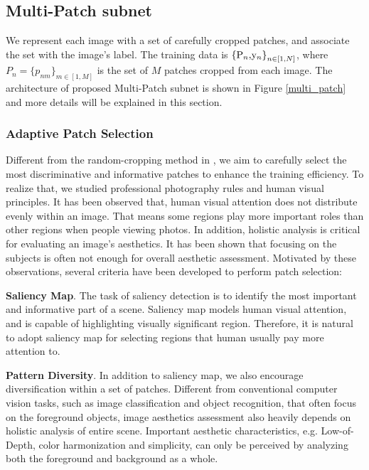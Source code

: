 \documentclass[10pt,twocolumn,letterpaper]{article}
\begin{document}
	\subsection{Multi-Patch subnet}
	We represent each image with a set of carefully cropped patches, and associate the set with the image's label.
	The training data is ${{\rm{\{ }}{{\rm{P}}_n}{\rm{, }}{{\rm{y}}_n}{\rm{\} }}_{n \in [1,N]}}$, where ${P_n} = {\{ {p_{nm}}\} _{m \in [1,M]}}$ is the set of $M$ patches cropped from each image. The architecture of proposed Multi-Patch subnet is shown in Figure \ref{multi_patch} and more details will be explained in this section. 
	
	\subsubsection{Adaptive Patch Selection}
	Different from the random-cropping method in \cite{Lu:2015:ICCV}, we aim to carefully select the most discriminative and informative patches to enhance the training efficiency. To realize that, we studied professional photography rules and human visual principles. It has been observed that, human visual attention does not distribute evenly within an image. That means some regions play more important roles than other regions when people viewing photos. In addition, holistic analysis is critical for evaluating an image's aesthetics. It has been shown that focusing on the subjects is often not enough for overall aesthetic assessment. Motivated by these observations, several criteria have been developed to perform patch selection:
	
	\textbf{Saliency Map}. The task of saliency detection is to identify the most important and informative part of a scene. Saliency map models human visual attention, and is capable of highlighting visually significant region. Therefore, it is natural to adopt saliency map for selecting regions that human usually pay more attention to.
	
	\textbf{Pattern Diversity}. In addition to saliency map, we also encourage diversification within a set of patches. Different from conventional computer vision tasks, such as image classification and object recognition, that often focus on the foreground objects, image aesthetics assessment also heavily depends on holistic analysis of entire scene. Important aesthetic characteristics, e.g. Low-of-Depth, color harmonization and simplicity, can only be perceived by analyzing both the foreground and background as a whole. 
	
\end{document}
